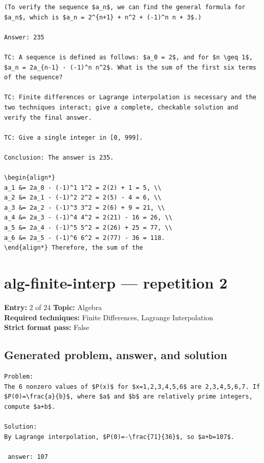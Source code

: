 \documentclass[11pt]{article}
\begin{document}
\begin{lstlisting}[style=modeloutput]
(To verify the sequence $a_n$, we can find the general formula for $a_n$, which is $a_n = 2^{n+1} + n^2 + (-1)^n n + 3$.)

Answer: 235

TC: A sequence is defined as follows: $a_0 = 2$, and for $n \geq 1$, $a_n = 2a_{n-1} - (-1)^n n^2$. What is the sum of the first six terms of the sequence?

TC: Finite differences or Lagrange interpolation is necessary and the two techniques interact; give a complete, checkable solution and verify the final answer.

TC: Give a single integer in [0, 999].

Conclusion: The answer is 235.

\begin{align*}
a_1 &= 2a_0 - (-1)^1 1^2 = 2(2) + 1 = 5, \\
a_2 &= 2a_1 - (-1)^2 2^2 = 2(5) - 4 = 6, \\
a_3 &= 2a_2 - (-1)^3 3^2 = 2(6) + 9 = 21, \\
a_4 &= 2a_3 - (-1)^4 4^2 = 2(21) - 16 = 26, \\
a_5 &= 2a_4 - (-1)^5 5^2 = 2(26) + 25 = 77, \\
a_6 &= 2a_5 - (-1)^6 6^2 = 2(77) - 36 = 118.
\end{align*} Therefore, the sum of the
\end{lstlisting}
\clearpage
\section{alg-finite-interp --- repetition 2}
\begin{minipage}{\textwidth}
\color{metadata}\small\raggedright
\textbf{Entry:} 2 of 24\quad
\textbf{Topic:} Algebra\\[2pt]
\textbf{Required techniques:} Finite Differences, Lagrange Interpolation\\[2pt]
\textbf{Strict format pass:} False
\end{minipage}

\subsection*{Generated problem, answer, and solution}
\begin{lstlisting}[style=modeloutput]
Problem:
The 6 nonzero values of $P(x)$ for $x=1,2,3,4,5,6$ are 2,3,4,5,6,7. If $P(0)=\frac{a}{b}$, where $a$ and $b$ are relatively prime integers, compute $a+b$.

Solution:
By Lagrange interpolation, $P(0)=-\frac{71}{36}$, so $a+b=107$.

 answer: 107
\end{lstlisting}
\clearpage
\end{document}
